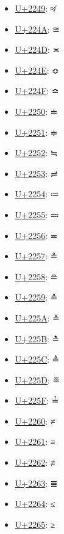 \begin{itemize}
	\item \href{https://decodeunicode.org/en/u+2249}{U+2249}: ≉
	\item \href{https://decodeunicode.org/en/u+224A}{U+224A}: ≊
	\item \href{https://decodeunicode.org/en/u+224D}{U+224D}: ≍
	\item \href{https://decodeunicode.org/en/u+224E}{U+224E}: ≎
	\item \href{https://decodeunicode.org/en/u+224F}{U+224F}: ≏
	\item \href{https://decodeunicode.org/en/u+2250}{U+2250}: ≐
	\item \href{https://decodeunicode.org/en/u+2251}{U+2251}: ≑
	\item \href{https://decodeunicode.org/en/u+2252}{U+2252}: ≒
	\item \href{https://decodeunicode.org/en/u+2253}{U+2253}: ≓
	\item \href{https://decodeunicode.org/en/u+2254}{U+2254}: ≔
	\item \href{https://decodeunicode.org/en/u+2255}{U+2255}: ≕
	\item \href{https://decodeunicode.org/en/u+2256}{U+2256}: ≖
	\item \href{https://decodeunicode.org/en/u+2257}{U+2257}: ≗
	\item \href{https://decodeunicode.org/en/u+2258}{U+2258}: ≘
	\item \href{https://decodeunicode.org/en/u+2259}{U+2259}: ≙
	\item \href{https://decodeunicode.org/en/u+225A}{U+225A}: ≚
	\item \href{https://decodeunicode.org/en/u+225B}{U+225B}: ≛
	\item \href{https://decodeunicode.org/en/u+225C}{U+225C}: ≜
	\item \href{https://decodeunicode.org/en/u+225D}{U+225D}: ≝
	\item \href{https://decodeunicode.org/en/u+225F}{U+225F}: ≟
	\item \href{https://decodeunicode.org/en/u+2260}{U+2260}: ≠
	\item \href{https://decodeunicode.org/en/u+2261}{U+2261}: ≡
	\item \href{https://decodeunicode.org/en/u+2262}{U+2262}: ≢
	\item \href{https://decodeunicode.org/en/u+2263}{U+2263}: ≣
	\item \href{https://decodeunicode.org/en/u+2264}{U+2264}: ≤
	\item \href{https://decodeunicode.org/en/u+2265}{U+2265}: ≥

\end{itemize}
